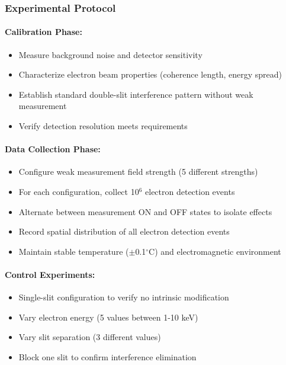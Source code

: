 \documentclass[12pt,letterpaper]{article}
\begin{document}
\subsubsection{Experimental Protocol}

\paragraph{Calibration Phase:}
\begin{itemize}
\item Measure background noise and detector sensitivity
\item Characterize electron beam properties (coherence length, energy spread)
\item Establish standard double-slit interference pattern without weak measurement
\item Verify detection resolution meets requirements
\end{itemize}

\paragraph{Data Collection Phase:}
\begin{itemize}
\item Configure weak measurement field strength (5 different strengths)
\item For each configuration, collect 10$^{6}$ electron detection events
\item Alternate between measurement ON and OFF states to isolate effects
\item Record spatial distribution of all electron detection events
\item Maintain stable temperature ($\pm$0.1$^{\circ}$C) and electromagnetic environment
\end{itemize}

\paragraph{Control Experiments:}
\begin{itemize}
\item Single-slit configuration to verify no intrinsic modification
\item Vary electron energy (5 values between 1-10 keV)
\item Vary slit separation (3 different values)
\item Block one slit to confirm interference elimination
\end{itemize}
\end{document}
